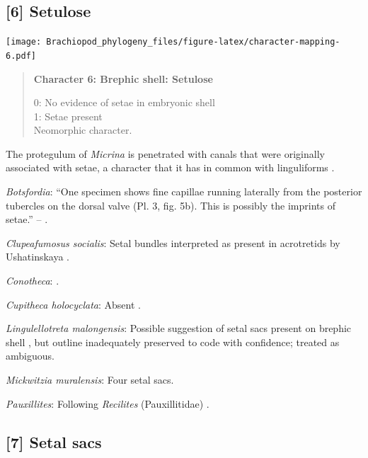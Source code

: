 \documentclass[openany]{book}
\begin{document}
\subsection*{{[}6{]} Setulose}\label{setulose}

\texttt{[image: Brachiopod\_phylogeny\_files/figure-latex/character-mapping-6.pdf]}

\begin{quote}
\textbf{Character 6: Brephic shell: Setulose}

0: No evidence of setae in embryonic shell\\
1: Setae present\\
Neomorphic character.
\end{quote}

The protegulum of \emph{Micrina} is penetrated with canals that were
originally associated with setae, a character that it has in common with
linguliforms \citep{Holmer2011Firstrecord}.

\hypertarget{Botsfordia-coding-6}{}
\emph{Botsfordia}: ``One specimen shows fine capillae running laterally
from the posterior tubercles on the dorsal valve (Pl. 3, fig. 5b). This
is possibly the imprints of setae.'' --
\citet{Ushatinskaya2016Revisionof}.

\hypertarget{Clupeafumosus_socialis-coding-6}{}
\emph{Clupeafumosus socialis}: Setal bundles interpreted as present in
acrotretids by Ushatinskaya \citeyearpar{Ushatinskaya2016Protegulumand}.

\hypertarget{Conotheca-coding-6}{}
\emph{Conotheca}: \citep{Wrona2003}.

\hypertarget{Cupitheca_holocyclata-coding-6}{}
\emph{Cupitheca holocyclata}: Absent \citep{Skovsted2016}.

\hypertarget{Lingulellotreta_malongensis-coding-6}{}
\emph{Lingulellotreta malongensis}: Possible suggestion of setal sacs
present on brephic shell \citep{Holmer1997EarlyCambrian, Li2004}, but
outline inadequately preserved to code with confidence; treated as
ambiguous.

\hypertarget{Mickwitzia_muralensis-coding-6}{}
\emph{Mickwitzia muralensis}: Four setal sacs.

\hypertarget{Pauxillites-coding-6}{}
\emph{Pauxillites}: Following \emph{Recilites} (Pauxillitidae)
\citep{Dzik1978}.

\subsection*{{[}7{]} Setal sacs}\label{setal-sacs}
\end{document}
